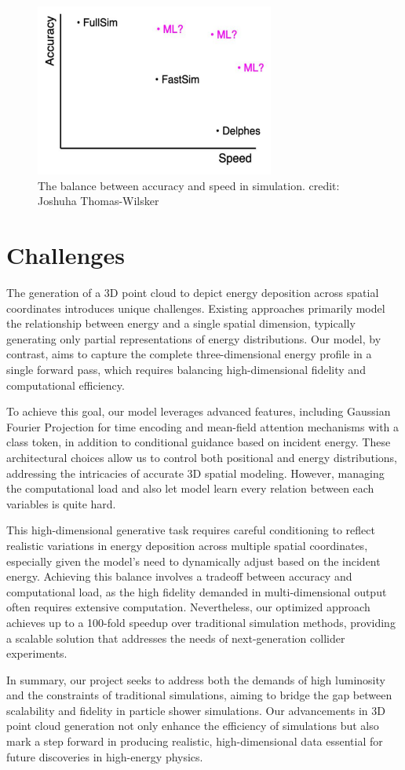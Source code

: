 \begin{figure}[H]
    \centering
    \includegraphics[width=0.7\textwidth]{Figures/fast.png}
    \caption{The balance between accuracy and speed in simulation. credit: Joshuha Thomas-Wilsker}
    \label{fast}
\end{figure}

\section{Challenges}

The generation of a 3D point cloud to depict energy deposition across spatial coordinates introduces unique challenges. Existing approaches primarily model the relationship between energy and a single spatial dimension, typically generating only partial representations of energy distributions. Our model, by contrast, aims to capture the complete three-dimensional energy profile in a single forward pass, which requires balancing high-dimensional fidelity and computational efficiency.

To achieve this goal, our model leverages advanced features, including Gaussian Fourier Projection for time encoding and mean-field attention mechanisms with a class token, in addition to conditional guidance based on incident energy. These architectural choices allow us to control both positional and energy distributions, addressing the intricacies of accurate 3D spatial modeling. However, managing the computational load and also let model learn every relation between each variables is quite hard.

This high-dimensional generative task requires careful conditioning to reflect realistic variations in energy deposition across multiple spatial coordinates, especially given the model’s need to dynamically adjust based on the incident energy. Achieving this balance involves a tradeoff between accuracy and computational load, as the high fidelity demanded in multi-dimensional output often requires extensive computation. Nevertheless, our optimized approach achieves up to a 100-fold speedup over traditional simulation methods, providing a scalable solution that addresses the needs of next-generation collider experiments.

In summary, our project seeks to address both the demands of high luminosity and the constraints of traditional simulations, aiming to bridge the gap between scalability and fidelity in particle shower simulations. Our advancements in 3D point cloud generation not only enhance the efficiency of simulations but also mark a step forward in producing realistic, high-dimensional data essential for future discoveries in high-energy physics.